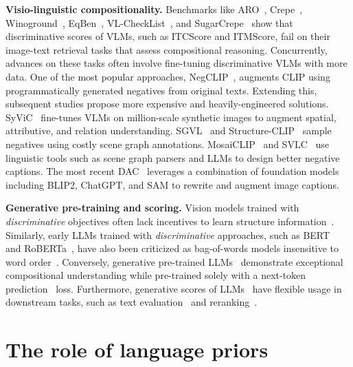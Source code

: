\documentclass{article} \usepackage{iclr2024_conference,times}
\begin{document}
{\bf Visio-linguistic compositionality.} Benchmarks like ARO~\citep{aro}, Crepe~\citep{crepe}, Winoground~\citep{winoground}, EqBen~\citep{eqben}, VL-CheckList~\citep{vlchecklist}, and SugarCrepe~\citep{sugarcrepe} show that discriminative scores of VLMs, such as ITCScore and ITMScore, fail on their image-text retrieval tasks that assess compositional reasoning. Concurrently, advances on these tasks often involve fine-tuning discriminative VLMs with more data. One of the most popular approaches, NegCLIP~\citep{aro}, augments CLIP using programmatically generated negatives from original texts. Extending this, subsequent studies propose more expensive and heavily-engineered solutions. SyViC~\citep{cascante2023going} fine-tunes VLMs on million-scale synthetic images to augment spatial, attributive, and relation understanding. SGVL~\citep{herzig2023incorporating} and Structure-CLIP~\citep{huang2023structure} sample negatives using costly scene graph annotations. MosaiCLIP~\citep{singh2023coarse} and SVLC~\citep{doveh2022teaching} use linguistic tools such as scene graph parsers and LLMs to design better negative captions. The most recent DAC~\citep{doveh2023dense} leverages a combination of foundation models including BLIP2, ChatGPT, and SAM to rewrite and augment image captions. 

{\bf Generative pre-training and scoring. } Vision models trained with {\em discriminative} objectives often lack incentives to learn structure information~\citep{brendel2019approximating, tejankar2021fistful}. Similarly, early LLMs trained with {\em discriminative} approaches, such as BERT~\citep{bert} and RoBERTa~\citep{roberta}, have also been criticized as bag-of-words models insensitive to word order~\citep{bertolini2022testing, hessel2021effective, papadimitriou2022classifying, sinha2021masked}. Conversely, generative pre-trained LLMs~\citep{gpt2} demonstrate exceptional compositional understanding while pre-trained solely with a next-token prediction~\citep{bengio2003neural} loss. Furthermore, generative scores of LLMs~\citep{gpt4, flan, opt} have flexible usage in downstream tasks, such as text evaluation~\citep{bartscore, fu2023gptscore} and reranking~\citep{keskar2019ctrl}. 














\section{The role of language priors}
\label{sec:language_prior}
\end{document}
